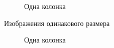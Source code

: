 \documentclass[
  english,
  russian,
  12pt,
  a4paper,
  DIV=11,
  numbers=noendperiod]{scrreprt}
\begin{document}
\begin{figure}


\caption{\label{fig-021}Одна колонка}

\end{figure}%

Изображения одинакового размера

\begin{figure}


\caption{\label{fig-022}Одна колонка}

\end{figure}%
\end{document}
